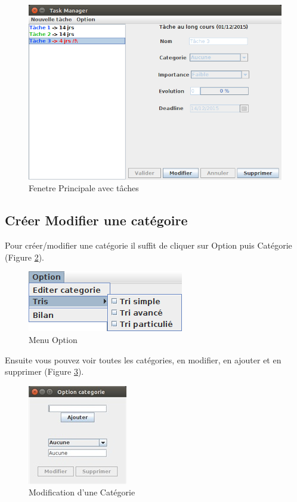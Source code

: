 \documentclass{article}
\begin{document}
\begin{figure}[!h]
	\centering
	\includegraphics[scale=0.34]{images/CaptureMainDIsplay3.png}
	\caption{Fenetre Principale avec tâches}
	\label{Fenetre principale 2}
\end{figure}

\clearpage
\subsection{Créer Modifier une catégoire}
Pour créer/modifier une catégorie il suffit de cliquer sur Option puis Catégorie (Figure \ref{barre Opiton}).

\begin{figure}[h]
	\centering
	\includegraphics[scale=0.6]{images/MenuOption.png}
	\caption{Menu Option}
	\label{barre Opiton}
\end{figure}

Ensuite vous pouvez voir toutes les catégories, en modifier, en ajouter et en supprimer (Figure \ref{modif Opiton}).

\begin{figure}[h]
	\centering
	\includegraphics[scale=0.8]{images/Capture_edit_categorie.jpg}
	\caption{Modification d'une Catégorie}
	\label{modif Opiton}
\end{figure}
\end{document}
